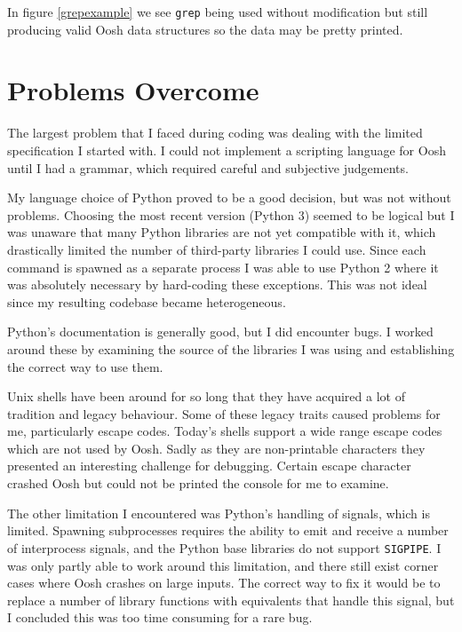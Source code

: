 \documentclass[12pt,twoside,notitlepage]{report}
\begin{document}
In figure \ref{grepexample} we see {\tt grep} being used without
modification but still producing valid Oosh data structures so the
data may be pretty printed.

\section{Problems Overcome}

The largest problem that I faced during coding was dealing with the limited
specification I started with. I could not implement a scripting
language for Oosh until I had a grammar, which required careful and
subjective judgements.

My language choice of Python proved to be a good decision, but was not
without problems. Choosing the most recent version (Python 3) seemed
to be logical but I was unaware that many Python libraries are not yet
compatible with it, which drastically limited the number of
third-party libraries I could use. Since each command is spawned as a
separate process I was able to use Python 2 where it was absolutely
necessary by hard-coding these exceptions. This was not ideal since my
resulting codebase became heterogeneous.

Python's documentation is generally good, but I did encounter bugs. I
worked around these by examining the source of the libraries I was
using and establishing the correct way to use them.

Unix shells have been around for so long that they have acquired a lot
of tradition and legacy behaviour. Some of these legacy traits caused
problems for me, particularly escape codes. Today's shells support a
wide range escape codes which are not used by Oosh. Sadly as they are
non-printable characters they presented an interesting challenge for
debugging. Certain escape character crashed Oosh but could not be
printed the console for me to examine.

The other limitation I encountered was Python's handling of signals,
which is limited. Spawning subprocesses requires the ability to emit
and receive a number of interprocess signals, and the Python base
libraries do not support {\tt SIGPIPE}. I was only partly able to work
around this limitation, and there still exist corner cases where Oosh
crashes on large inputs. The correct way to fix it would be to replace
a number of library functions with equivalents that handle this
signal, but I concluded this was too time consuming for a rare bug.

\cleardoublepage
\end{document}
